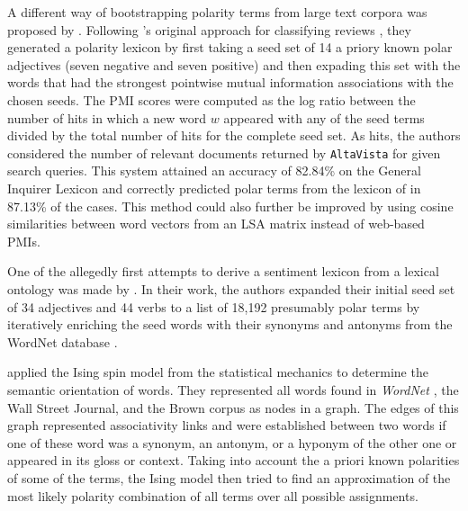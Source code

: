 A different way of bootstrapping polarity terms from large text
corpora was proposed by \citet{Turney:03}.  Following
\citeauthor{Turney:02}'s original approach for classifying reviews
\citep{Turney:02}, they generated a polarity lexicon by first taking a
seed set of 14 a priory known polar adjectives (seven negative and
seven positive) and then expading this set with the words that had the
strongest pointwise mutual information associations with the chosen
seeds.  The PMI scores were computed as the log ratio between the
number of hits in which a new word $w$ appeared with any of the seed
terms divided by the total number of hits for the complete seed set.
As hits, the authors considered the number of relevant documents
returned by \texttt{AltaVista} for given search queries.  This system
attained an accuracy of 82.84\% on the General Inquirer Lexicon
\citep{Stone:66} and correctly predicted polar terms from the lexicon
of \cite{Hatzivassi:97} in 87.13\% of the cases. This method could
also further be improved by using cosine similarities between word
vectors from an LSA matrix instead of web-based PMIs.

One of the allegedly first attempts to derive a sentiment lexicon from
a lexical ontology was made by \citet{Kim:04}.  In their work, the
authors expanded their initial seed set of 34 adjectives and 44 verbs
to a list of 18,192 presumably polar terms by iteratively enriching
the seed words with their synonyms and antonyms from the WordNet
database \citep{Miller:95}.



\citet{Takamura:05} applied the Ising spin model from the statistical
mechanics to determine the semantic orientation of words.  They
represented all words found in \emph{WordNet} \cite{Miller:95}, the
Wall Street Journal, and the Brown corpus as nodes in a graph.  The
edges of this graph represented associativity links and were
established between two words if one of these word was a synonym, an
antonym, or a hyponym of the other one or appeared in its gloss or
context.  Taking into account the a priori known polarities of some of
the terms, the Ising model then tried to find an approximation of the
most likely polarity combination of all terms over all possible
assignments.

